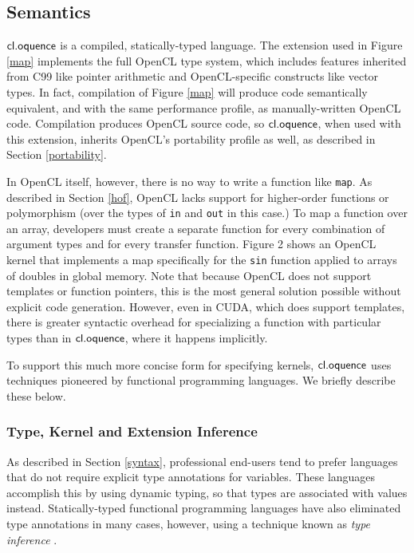\documentclass[10pt, conference, compsocconf]{IEEEtran}
\begin{document}
\subsection{Semantics}
$\textsf{cl.oquence}$ is a compiled, statically-typed language. The extension used in Figure \ref{map} implements the full OpenCL type system, which includes features inherited from C99 like pointer arithmetic and OpenCL-specific constructs like vector types. In fact, compilation of Figure \ref{map} will produce code semantically equivalent, and with the same performance profile, as manually-written OpenCL code. Compilation produces OpenCL source code, so $\textsf{cl.oquence}$, when used with this extension, inherits OpenCL's portability profile as well, as described in Section \ref{portability}.

In OpenCL itself, however, there is no way to write a function like \verb|map|. As described in Section \ref{hof}, OpenCL lacks support for higher-order functions or polymorphism (over the types of \verb|in| and \verb|out| in this case.) To map a function over an array, developers must create a separate function for every combination of argument types and for every transfer function. Figure 2 shows an OpenCL kernel that implements a map specifically for the \verb|sin| function applied to arrays of doubles in global memory. Note that because OpenCL does not support templates or function pointers, this is the most general solution possible without explicit code generation. However, even in CUDA, which does support templates, there is greater syntactic overhead for specializing a function with particular types than in $\textsf{cl.oquence}$, where it happens implicitly.

To support this much more concise form for specifying kernels, $\textsf{cl.oquence}$ uses techniques pioneered by functional programming languages. We briefly describe these below.

\subsubsection{Type, Kernel and Extension Inference}
As described in Section \ref{syntax}, professional end-users tend to prefer languages that do not require explicit type annotations for variables. These languages accomplish this by using dynamic typing, so that types are associated with values instead. Statically-typed functional programming languages have also eliminated type annotations in many cases, however, using a technique known as {\it type inference} \cite{tapl}. 
\end{document}
